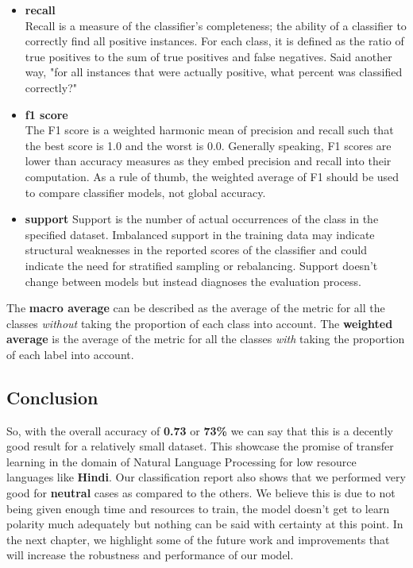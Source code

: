 \documentclass[a4paper, 12pt]{article}
\begin{document}
\begin{sloppypar}
\begin{itemize}
\item{\textbf{recall} \\ 
Recall is a measure of the classifier's completeness; the ability of a classifier to correctly find all positive instances. For each class, it is defined as the ratio of true positives to the sum of true positives and false negatives. Said another way, "for all instances that were actually positive, what percent was classified correctly?"\cite{noauthor_classification_nodate} }
\item{\textbf{f1 score} \\
The F1 score is a weighted harmonic mean of precision and recall such that the best score is 1.0 and the worst is 0.0. Generally speaking, F1 scores are lower than accuracy measures as they embed precision and recall into their computation. As a rule of thumb, the weighted average of F1 should be used to compare classifier models, not global accuracy.\cite{noauthor_classification_nodate}
}
\item{\textbf{support}
Support is the number of actual occurrences of the class in the specified dataset. Imbalanced support in the training data may indicate structural weaknesses in the reported scores of the classifier and could indicate the need for stratified sampling or rebalancing. Support doesn't change between models but instead diagnoses the evaluation process.\cite{noauthor_classification_nodate} }
\end{itemize}
The \textbf{macro average} can be described as the average of the metric for all the classes \textit{without} taking the proportion of each class into account. The \textbf{weighted average} is the average of the metric for all the classes \textit{with} taking the proportion of each label into account.

\subsection{Conclusion}

So, with the overall accuracy of \textbf{0.73} or \textbf{73\%} we can say that this is a decently good result for a relatively small dataset. This showcase the promise of transfer learning in the domain of Natural Language Processing for low resource languages like \textbf{Hindi}. Our classification report also shows that we performed very good for \textbf{neutral} cases as compared to the others. We believe this is due to not being given enough time and resources to train, the model doesn't get to learn polarity much adequately but nothing can be said with certainty  at this point. In the next chapter, we highlight some of the future work and improvements that will increase the robustness and performance of our model.
  \clearpage

\end{sloppypar}
\end{document}
